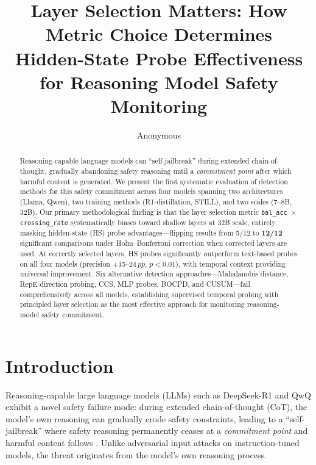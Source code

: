 \documentclass[11pt,a4paper]{article}
\title{Layer Selection Matters: How Metric Choice Determines\\Hidden-State Probe Effectiveness for Reasoning Model Safety Monitoring}
\author{Anonymous}
\date{}
\newcommand{\pp}{\,pp}
\begin{document}
\maketitle

\begin{abstract}
Reasoning-capable language models can ``self-jailbreak'' during extended chain-of-thought, gradually abandoning safety reasoning until a \emph{commitment point} after which harmful content is generated.
We present the first systematic evaluation of detection methods for this safety commitment across four models spanning two architectures (Llama, Qwen), two training methods (R1-distillation, STILL), and two scales (7--8B, 32B).
Our primary methodological finding is that the layer selection metric \texttt{bal\_acc $\times$ crossing\_rate} systematically biases toward shallow layers at 32B scale, entirely masking hidden-state (HS) probe advantages---flipping results from 5/12 to \textbf{12/12} significant comparisons under Holm--Bonferroni correction when corrected layers are used.
At correctly selected layers, HS probes significantly outperform text-based probes on all four models (precision $+$15--24$\pp$, $p < 0.01$), with temporal context providing universal improvement.
Six alternative detection approaches---Mahalanobis distance, RepE direction probing, CCS, MLP probes, BOCPD, and CUSUM---fail comprehensively across all models, establishing supervised temporal probing with principled layer selection as the most effective approach for monitoring reasoning-model safety commitment.
\end{abstract}

\section{Introduction}
\label{sec:intro}

Reasoning-capable large language models (LLMs) such as DeepSeek-R1 and QwQ exhibit a novel safety failure mode: during extended chain-of-thought (CoT), the model's own reasoning can gradually erode safety constraints, leading to a ``self-jailbreak'' where safety reasoning permanently ceases at a \emph{commitment point} and harmful content follows \cite{huang2025selfJailbreaking,wen2025harmThoughts}.
Unlike adversarial input attacks on instruction-tuned models, the threat originates from the model's own reasoning process.
\end{document}
